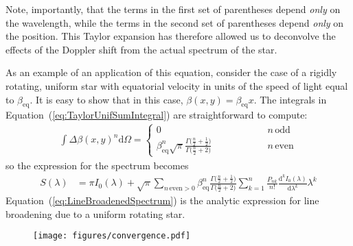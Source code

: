 \documentclass[modern]{aastex62}
\begin{document}
Note, importantly, that the terms in the first set of parentheses depend \emph{only} on the wavelength,
while the terms in the second set of parentheses depend \emph{only} on the position.
This Taylor expansion has therefore allowed us to deconvolve the effects of the Doppler
shift from the actual spectrum of the star.

As an example of an application of this equation, consider the case of a rigidly rotating,
uniform star with equatorial velocity in units of the speed of light equal to $\beta_\mathrm{eq}$. 
It is easy to show that in this case, $\beta(x, y) = \beta_\mathrm{eq} x$. The integrals
in Equation~(\ref{eq:TaylorUnifSumIntegral}) are straightforward to compute:
%
\begin{align}
    \int{\Delta\beta(x, y)^n}\mathrm{d}\Omega = 
        \begin{cases} 
            0 & \quad\quad\quad\quad\quad n \, \mathrm{odd} \\
            \beta_\mathrm{eq}^n\sqrt{\pi}\frac{\Gamma\big(\frac{n}{2} + \frac{1}{2}\big)}{\Gamma\big(\frac{n}{2} + 2\big)} & \quad\quad\quad\quad\quad n \, \mathrm{even}
        \end{cases}
\end{align}
%
so the expression for the spectrum becomes
\begin{align}
    \label{eq:LineBroadenedSpectrum}
    S(\lambda) 
        &=
        \pi I_0(\lambda)
        + 
        \sqrt{\pi}
        \sum_{n\,\mathrm{even}>0}
            \beta_\mathrm{eq}^n
            \frac{\Gamma\big(\frac{n}{2} + \frac{1}{2}\big)}{\Gamma\big(\frac{n}{2} + 2\big)}
            \sum_{k=1}^n 
            \frac{P_{nk}}{n!} \frac{\mathrm{d}^k I_0(\lambda)}{\mathrm{d}\lambda^k} \lambda^k 
\end{align}
%
Equation~(\ref{eq:LineBroadenedSpectrum}) is the analytic expression for line broadening
due to a uniform rotating star.

\begin{figure}[p!]
    \centering
    \texttt{[image: figures/convergence.pdf]}
\end{figure}
\end{document}
